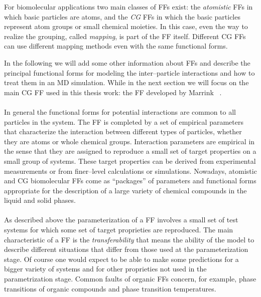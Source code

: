 For biomolecular applications two main classes of \acp{FF} exist: the \textit{atomistic} \acp{FF} in which basic
particles are atoms, and the \textit{\ac{CG}} \acp{FF} in which the basic particles represent atom groups or
small chemical moieties. In this case, even the way to realize the grouping, called \textit{mapping}, is part of
the \ac{FF} itself. Different \ac{CG} \acp{FF} can use different mapping methods even with the same functional forms.

In the following we will add some other information about \acp{FF} and describe the principal functional forms
for modeling the inter--particle interactions and how to treat them in an \ac{MD} simulation. While in the next
section we will focus on the main \ac{CG} \ac{FF} used in this thesis work: the  \ac{FF}
developed by Marrink \etal\, \cite{Martini}.

\paragraph{\textbf{}} In general the functional forms for potential interactions are
common to all particles in the system. The \ac{FF} is completed by a set of empirical parameters that
characterize the interaction between different types of particles, whether they are atoms or whole chemical
groups. Interaction parameters are empirical in the sense that they are assigned to reproduce a small set of
target properties on a small group of systems. These target properties can be derived from experimental
measurements or from finer--level calculations or simulations. Nowadays, atomistic and \ac{CG} biomolecular
\acp{FF} come as ``packages'' of parameters and functional forms appropriate for the description of a large
variety of chemical compounds in the liquid and solid phases.

\paragraph{\textbf{}} As described above the parameterization of a \ac{FF} involves a
small set of test systems for which some set of target proprieties are reproduced. The main characteristic of a
\ac{FF} is the \textit{transferability} that means the ability of the model to describe different situations that
differ from those used at the parameterization stage. Of course one would expect to be able to make some
predictions for a bigger variety of systems and for other proprieties not used in the parametrization stage.
Common faults of organic \acp{FF} concern, for example, phase transitions of organic compounds and phase
transition temperatures.

